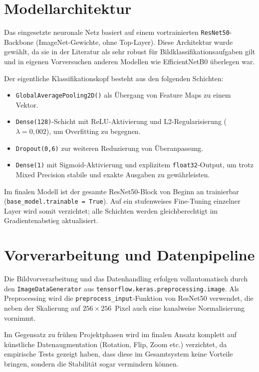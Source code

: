 \section{Modellarchitektur}

Das eingesetzte neuronale Netz basiert auf einem vortrainierten \texttt{ResNet50}-Backbone (ImageNet-Gewichte, ohne Top-Layer). Diese Architektur wurde gewählt, da sie in der Literatur als sehr robust für Bildklassifikationsaufgaben gilt und in eigenen Vorversuchen anderen Modellen wie EfficientNetB0 überlegen war.

Der eigentliche Klassifikationskopf besteht aus den folgenden Schichten:

\begin{itemize}
  \item \texttt{GlobalAveragePooling2D()} als Übergang von Feature Maps zu einem Vektor.
  \item \texttt{Dense(128)}-Schicht mit ReLU-Aktivierung und L2-Regularisierung ($\lambda=0{,}002$), um Overfitting zu begegnen.
  \item \texttt{Dropout(0{,}6)} zur weiteren Reduzierung von Überanpassung.
  \item \texttt{Dense(1)} mit Sigmoid-Aktivierung und explizitem \texttt{float32}-Output, um trotz Mixed Precision stabile und exakte Ausgaben zu gewährleisten.
\end{itemize}

Im finalen Modell ist der gesamte ResNet50-Block von Beginn an trainierbar (\texttt{base\_model.trainable = True}). Auf ein stufenweises Fine-Tuning einzelner Layer wird somit verzichtet; alle Schichten werden gleichberechtigt im Gradientenabstieg aktualisiert.

\section{Vorverarbeitung und Datenpipeline}

Die Bildvorverarbeitung und das Datenhandling erfolgen vollautomatisch durch den \texttt{ImageDataGenerator} aus \texttt{tensorflow.keras.preprocessing.image}. Als Preprocessing wird die \texttt{preprocess\_input}-Funktion von ResNet50 verwendet, die neben der Skalierung auf $256\times256$~Pixel auch eine kanalweise Normalisierung vornimmt. 

Im Gegensatz zu frühen Projektphasen wird im finalen Ansatz komplett auf künstliche Datenaugmentation (Rotation, Flip, Zoom etc.) verzichtet, da empirische Tests gezeigt haben, dass diese im Gesamtsystem keine Vorteile bringen, sondern die Stabilität sogar vermindern können.

